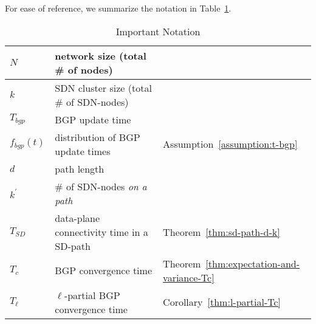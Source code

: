 For ease of reference, we summarize the notation in Table~\ref{table:important-notation}.
\begin{table}
\centering
\caption{Important Notation}
\label{table:important-notation}
\begin{tabular}{|l|l|l|}
\hline
{$N$}	& {network size (total \# of nodes)}&{}\\
\hline
{$k$}	& {SDN cluster size (total \# of SDN-nodes)}&{}\\
\hline
{$T_{bgp}$}	& {BGP update time}&{}\\
\hline
{$f_{bgp}(t)$}	& {distribution of BGP update times}&{Assumption~\ref{assumption:t-bgp}}\\
\hline
{$d$}	& {path length}&{}\\
\hline
{$k^{'}$}	& {\# of SDN-nodes \textit{on a path}}&{}\\
\hline
{$T_{SD}$}	& {data-plane connectivity time in a SD-path}&{Theorem~\ref{thm:sd-path-d-k}}\\
\hline
{$T_{c}$}	& {BGP convergence time}&{Theorem~\ref{thm:expectation-and-variance-Tc}}\\
\hline
{$T_{\ell}$}	& {$\ell$-partial BGP convergence time}&{Corollary~\ref{thm:l-partial-Tc}}\\
\hline
\end{tabular}
\end{table}